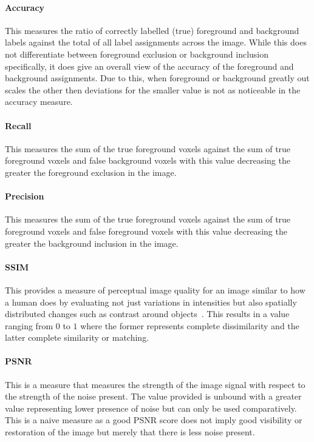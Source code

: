 \paragraph{Accuracy}
This measures the ratio of correctly labelled (true) foreground and background labels against the total of all label assignments across the image. While this does not differentiate between foreground exclusion or background inclusion specifically, it does give an overall view of the accuracy of the foreground and background assignments. Due to this, when foreground or background greatly out scales the other then deviations for the smaller value is not as noticeable in the accuracy measure.

\paragraph{Recall}
This measures the sum of the true foreground voxels against the sum of true foreground voxels and false background voxels with this value decreasing the greater the foreground exclusion in the image.

\paragraph{Precision}
This measures the sum of the true foreground voxels against the sum of true foreground voxels and false foreground voxels with this value decreasing the greater the background inclusion in the image.

\paragraph{SSIM}
This provides a measure of perceptual image quality for an image similar to how a human does by evaluating not just variations in intensities but also spatially distributed changes such as contrast around objects~\cite{ssim}. This results in a value ranging from $0$ to $1$ where the former represents complete dissimilarity and the latter complete similarity or matching.

\paragraph{PSNR}
This is a measure that measures the strength of the image signal with respect to the strength of the noise present. The value provided is unbound with a greater value representing lower presence of noise but can only be used comparatively. This is a naive measure as a good PSNR score does not imply good visibility or restoration of the image but merely that there is less noise present.

